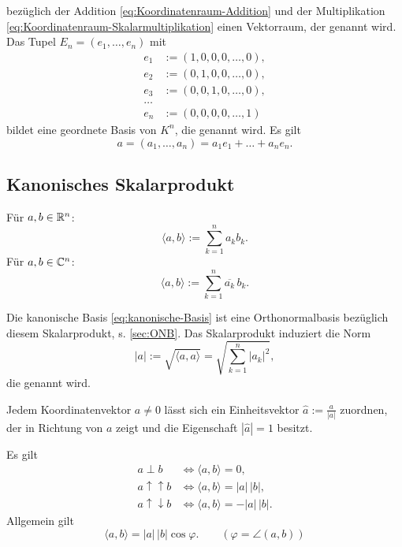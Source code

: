 bezüglich der Addition \eqref{eq:Koordinatenraum-Addition}
und der Multiplikation \eqref{eq:Koordinatenraum-Skalarmultiplikation}
einen Vektorraum, der  genannt wird.
Das Tupel $E_n=(e_1,\ldots,e_n)$ mit
\begin{equation}\label{eq:kanonische-Basis}
\begin{split}
e_1 &:= (1,0,0,0,\ldots, 0),\\
e_2 &:= (0,1,0,0,\ldots, 0),\\
e_3 &:= (0,0,1,0,\ldots, 0),\\
\ldots\\
e_n &:= (0,0,0,0,\ldots, 1)
\end{split}
\end{equation}
bildet eine geordnete Basis von $K^n$, die 
genannt wird. Es gilt
\begin{equation}
a = (a_1,\ldots,a_n) = a_1 e_1+\ldots+a_n e_n.
\end{equation}

\newpage
\subsection{Kanonisches Skalarprodukt}
\begin{definition}
Für $a,b\in\mathbb R^n$:
\begin{equation}
\langle a,b\rangle := \sum_{k=1}^n a_k b_k.
\end{equation}
Für $a,b\in\mathbb C^n$:
\begin{equation}
\langle a,b\rangle := \sum_{k=1}^n \overline{a_k}\,b_k.
\end{equation}
\end{definition}
\noindent
Die kanonische Basis \eqref{eq:kanonische-Basis} ist eine
Orthonormalbasis bezüglich diesem Skalarprodukt, s. \ref{sec:ONB}.
Das Skalarprodukt induziert die Norm
\begin{equation}
|a| := \sqrt{\langle a,a\rangle} = \sqrt{\textstyle \sum_{k=1}^n |a_k|^2},
\end{equation}
die  genannt wird.

Jedem Koordinatenvektor $a\ne 0$ lässt sich ein Einheitsvektor
$\hat a:=\frac{a}{|a|}$ zuordnen, der in Richtung von $a$ zeigt
und die Eigenschaft $|\hat a|=1$ besitzt.

Es gilt
\begin{align}
a\perp b &\iff \langle a,b\rangle=0,\\
a\uparrow\uparrow b &\iff \langle a,b\rangle = |a|\,|b|,\\
a\uparrow\downarrow b &\iff \langle a,b\rangle = -|a|\,|b|.
\end{align}
Allgemein gilt
\begin{equation}
\langle a,b\rangle = |a|\,|b|\cos\varphi.\qquad(\varphi=\angle (a,b))
\end{equation}

